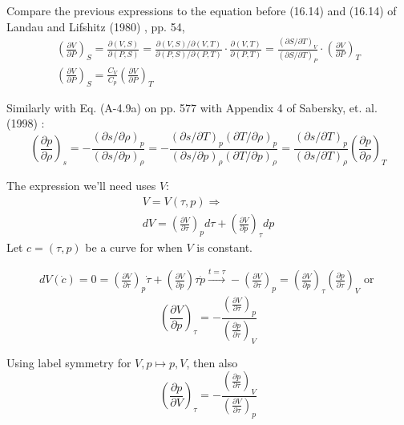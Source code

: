 Compare the previous expressions to the equation before (16.14) and (16.14) of Landau and Lifshitz (1980) \cite{LLandauELifshitz1980}, pp. 54,
\[
\begin{gathered}
\left( \frac{\partial V}{ \partial  P } \right)_S = \frac{\partial (V, S) }{ \partial (P, S)} = \frac{\partial( V,S) / \partial (V, T) }{ \partial (P, S)/ \partial (P, T)} \cdot \frac{ \partial (V, T) }{ \partial (P ,T)} = \frac{(\partial S/ \partial T)_V }{ (\partial S / \partial T)_P} \cdot \left( \frac{ \partial V}{ \partial P} \right)_T \\
\left( \frac{\partial V}{ \partial  P } \right)_S = \frac{ C_V}{ C_p} \left( \frac{\partial V}{ \partial  P } \right)_T
\end{gathered}
\]

Similarly with Eq. (A-4.9a) on pp. 577 with Appendix 4 of  Sabersky, et. al. (1998) \cite{SAHG1998}:
\[
\left( \frac{ \partial p }{ \partial \rho} \right)_s = - \frac{ (\partial s / \partial \rho)_p }{ (\partial s / \partial p)_{\rho}}  = - \frac{ (\partial s / \partial T)_p (\partial T / \partial \rho)_p }{ (\partial s / \partial p)_{\rho} (\partial T / \partial p )_{\rho}} = \frac{ (\partial s / \partial T)_p }{ (\partial s / \partial T)_{\rho}} \left( \frac{ \partial p }{ \partial \rho} \right)_T
\]

The expression we'll need uses $V$:
\[
\begin{gathered}
V = V(\tau, p) \Longrightarrow \\
dV = \left( \frac{\partial V}{\partial \tau} \right)_p d\tau + \left( \frac{\partial V}{\partial p} \right)_{\tau} dp 
\end{gathered}
\]
Let $c=(\tau, p)$  be a curve for when $V$ is constant.

\[
\begin{gathered}
dV(\dot{c}) = 0 = \left( \frac{\partial V}{\partial \tau} \right)_p \dot{\tau} + \left( \frac{\partial V}{ \partial p } \right){\tau} \dot{p} \xrightarrow{ t = \tau} - \left( \frac{\partial V}{ \partial \tau} \right)_p = \left( \frac{\partial V}{\partial p} \right)_{\tau} \left( \frac{\partial p}{\partial \tau} \right)_V \text{ or } 
\end{gathered}
\]
\begin{equation}
\left( \frac{\partial V}{\partial p} \right)_{\tau} = -\frac{\left( \frac{\partial V}{\partial \tau} \right)_p }{ \left( \frac{\partial p}{\partial \tau} \right)_V}
\end{equation}

Using label symmetry for $V, p \mapsto p, V$, then also
\[
\left( \frac{\partial p}{\partial V} \right)_{\tau} = -\frac{\left( \frac{\partial p}{\partial \tau} \right)_V }{ \left( \frac{\partial V}{\partial \tau} \right)_p}
\]

